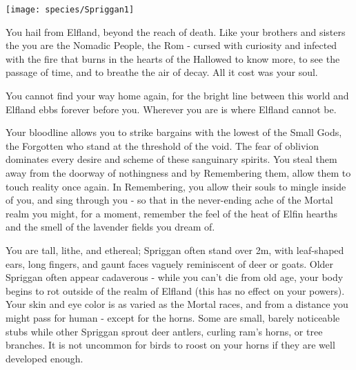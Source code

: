 

\begin{center}
\texttt{[image: species/Spriggan1]}
\end{center}

\begin{multicols*}{2}\raggedcolumns

  
  You hail from Elfland, beyond the reach of death.  Like your brothers and sisters the \Murk you are the Nomadic People, the Rom - cursed with curiosity and infected with the fire that burns in the hearts of the Hallowed to know more, to see the passage of time, and to breathe the air of decay.  All it cost was your soul.  

  You cannot find your way home again, for the bright line between this world and Elfland ebbs forever before you.  Wherever you are is where Elfland cannot be.

  Your bloodline allows you to strike bargains with the lowest of the Small Gods, the Forgotten who stand at the threshold of the void.  The fear of oblivion dominates every desire and scheme of these sanguinary spirits.  You steal them away from the doorway of nothingness and by Remembering them, allow them to touch reality once again.  In Remembering, you allow their souls to mingle inside of you, and sing through you - so that in the never-ending ache of the Mortal realm you might, for a moment, remember the feel of the heat of Elfin hearths and the smell of the lavender fields you dream of.  

  You are tall, lithe, and ethereal; Spriggan often stand over 2m, with leaf-shaped ears, long fingers, and gaunt faces vaguely reminiscent of deer or goats.  Older Spriggan often appear cadaverous - while you can't die from old age, your body begins to rot outside of the realm of Elfland (this has no effect on your powers).  Your skin and eye color is as varied as the Mortal races, and from a distance you might pass for human - except for the horns.  Some are small, barely noticeable stubs while other Spriggan sprout deer antlers, curling ram's horns, or tree branches.  It is not uncommon for birds to roost on your horns if they are well developed enough.



\end{multicols*}
